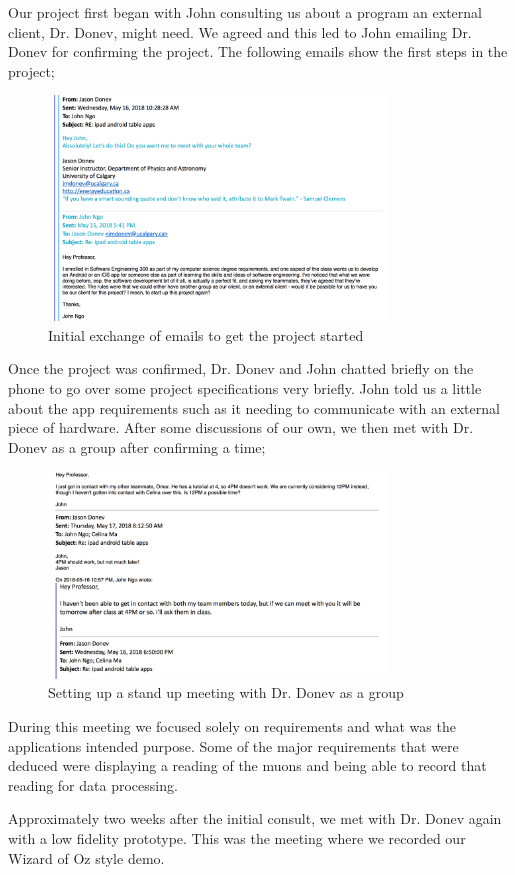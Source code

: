 \documentclass[11pt,a4paper]{article}
\begin{document}
Our project first began with John consulting us about a program an external client, Dr. Donev,  might need. We agreed and this led to John emailing Dr. Donev  for confirming the project. The following emails show the first steps in the project; 
\bigskip
\begin{figure}[h]
  \centering
      \includegraphics[width=0.8\textwidth]{1.png}
  \caption{Initial exchange of emails to get the project started}
\end{figure}

\newpage
Once the project was confirmed, Dr. Donev and John chatted briefly on the phone to go over some project specifications very briefly. John told us a little about the app requirements such as it needing to communicate with an external piece of hardware. After some discussions of our own, we then met with Dr. Donev as a group after confirming a time;


\bigskip
\begin{figure}[h]
  \centering
      \includegraphics[width=0.8\textwidth]{3.png}

  \caption{Setting up a stand up meeting with Dr. Donev as a group}
\end{figure}


During this meeting we focused solely on requirements and what was the applications intended purpose. Some of the major requirements that were deduced were displaying a reading of the muons and being able to record that reading for data processing.

Approximately two weeks after the initial consult, we met with Dr. Donev again with a low fidelity prototype. This was the meeting where we recorded our Wizard of Oz style demo. 
\end{document}
